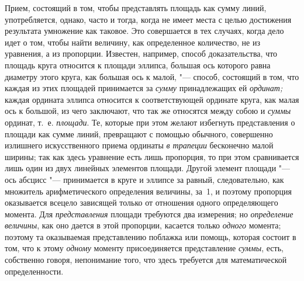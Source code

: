 Прием, состоящий в том, чтобы представлять площадь как сумму линий,
употребляется, однако, часто и тогда, когда не имеет места с целью достижения
результата умножение как таковое. Это совершается в тех случаях, когда дело
идет о том, чтобы найти величину, как определенное количество, не из уравнения,
а из пропорции. Известен, например, способ доказательства, что площадь круга
относится к площади эллипса, большая ось которого равна диаметру этого круга,
как большая ось к малой, "--- способ, состоящий в том, что каждая из этих
площадей принимается за {\em сумму} принадлежащих ей {\em ординат;} каждая
ордината эллипса относится к соответствующей ординате круга, как малая ось
к большой, из чего заключают, что так же относятся между собою и {\em суммы}
ординат, т.~е. {\em площади}. Те, которые при этом желают избегнуть
представления о площади как сумме линий, превращают с помощью обычного,
совершенно излишнего искусственного приема ординаты {\em в трапеции} бесконечно
малой ширины; так как здесь уравнение есть лишь пропорция, то при этом
сравнивается лишь один из двух линейных элементов площади. Другой элемент
площади "--- ось абсцисс "--- принимается в круге и эллипсе за равный,
следовательно, как множитель арифметического определения величины, за~1, и
поэтому пропорция оказывается всецело зависящей только от отношения одного
определяющего момента. Для {\em представления} площади требуются два измерения;
но {\em определение величины}, как оно дается в этой пропорции, касается только
{\em одного} момента; поэтому та оказываемая представлению поблажка или помощь,
которая состоит в том, что к этому {\em одному} моменту присоединяется
представление {\em суммы}, есть, собственно говоря, непонимание того, что здесь
требуется для математической определенности.

